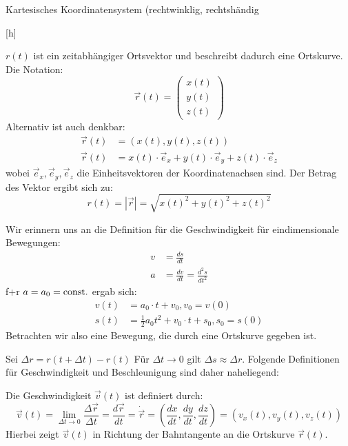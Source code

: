 \documentclass[a4paper,10pt]{scrartcl}
\begin{document}
\begin{seg}{Kartesisches Koordinatensystem (rechtwinklig, rechtshändig}
\begin{figure}[h]
\end{figure}[h]
\begin{figure}[h]
\end{figure}
$r(t)$ ist ein zeitabhängiger Ortsvektor und beschreibt dadurch eine Ortskurve. Die Notation:
\[
\vec r(t)=\begin{pmatrix} x(t)\\ y(t)\\z(t) \end{pmatrix}
\]
Alternativ ist auch denkbar:
\begin{align*}
\vec r(t)&=(x(t),y(t),z(t))\\
\vec r(t)&=x(t)\cdot \vec e_x+y(t)\cdot \vec e_y+z(t)\cdot\vec e_z
\end{align*}
wobei $\vec e_x, \vec e_y, \vec e_z$ die Einheitsvektoren der Koordinatenachsen sind. Der Betrag des Vektor ergibt sich zu:
\[
r(t)=|\vec r|=\sqrt{{x(t)}^2+{y(t)}^2+{z(t)}^2}
\]
\end{seg}
Wir erinnern uns an die Definition für die Geschwindigkeit für eindimensionale Bewegungen:
\begin{align*}
v&=\frac{ds}{dt}\\
a&= \frac{dv}{dt}=\frac{d^2s}{dt^2}
\end{align*}
f+r $a=a_0=\text{const.}$ ergab sich:
\begin{align*}
v(t)&=a_0\cdot t+v_0, v_0=v(0)\\
s(t)&= \frac{1}{2} a_0t^2+v_0\cdot t+s_0, s_0=s(0)
\end{align*}
Betrachten wir also eine Bewegung, die durch eine Ortskurve gegeben ist.
\begin{figure}[h]
\end{figure}
Sei $\Delta r=r(t+\Delta t)-r(t)$ Für $\Delta t\rightarrow 0$ gilt $\Delta s\approx \Delta r$.  Folgende Definitionen für Geschwindigkeit und Beschleunigung sind daher naheliegend:
\begin{df}[Geschwindigkeit]
Die Geschwindigkeit $\vec v(t)$ ist definiert durch:
\[\vec v(t)=\lim\limits_{\Delta t\rightarrow 0} \frac{\Delta \vec r}{\Delta t} = \frac{d\vec{r}}{dt}=\dot{\vec r}=(\frac{dx}{dt},\frac{dy}{dt},\frac{dz}{dt})=(v_x(t),v_y(t),v_z(t))\]
Hierbei zeigt $\vec v(t)$ in Richtung der Bahntangente an die Ortskurve $\vec r(t)$.
\end{df}
\end{document}
